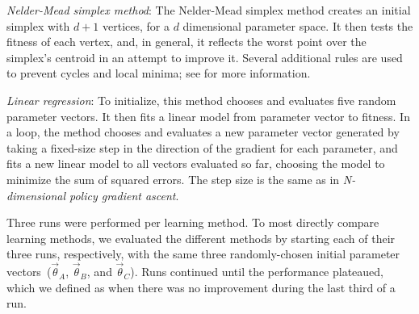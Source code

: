 
\emph{Nelder-Mead simplex method}: The Nelder-Mead simplex
  method creates an initial simplex with $d+1$ vertices,
  for a $d$ dimensional parameter space. It then tests the
  fitness of each vertex, and, in general, it reflects the worst point
  over the simplex's centroid in an attempt to improve it.  Several additional
  rules are used to prevent cycles and local minima; see \cite{nm} for more information.

\emph{Linear regression}: To initialize, this method chooses and
  evaluates five random parameter vectors. It then fits a linear model
  from parameter vector to fitness. In a loop, the method chooses and
  evaluates a new parameter vector generated by taking a fixed-size
  step in the direction of the gradient for each parameter, and fits a
  new linear model to all vectors evaluated so far, choosing the model
  to minimize the sum of squared errors. The step size is the same as in
  \emph{N-dimensional policy gradient ascent}.

Three runs were performed per learning method. To most directly compare learning methods, we
evaluated the different methods by starting each of their three runs, respectively, with the same three randomly-chosen initial parameter vectors~($\vec{\theta}_A$,
$\vec{\theta}_B$, and $\vec{\theta}_C$). Runs continued until the performance plateaued, which we defined as when there was no improvement during the last third of
a run.

